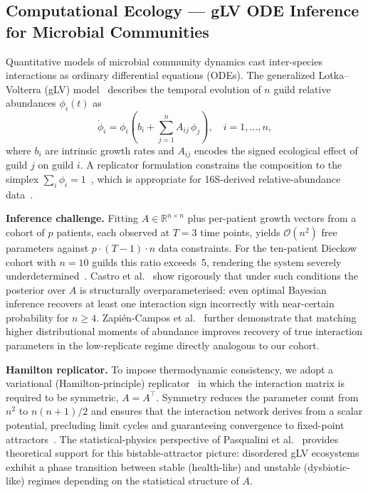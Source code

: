 \subsection{Computational Ecology --- gLV ODE Inference for Microbial Communities}
\label{sec:intro_ecol}

Quantitative models of microbial community dynamics cast inter-species interactions
as ordinary differential equations (ODEs).
The generalized Lotka--Volterra (gLV) model~\cite{Lotka1925Elements, Stein2013gLV}
describes the temporal evolution of $n$ guild relative abundances $\phi_i(t)$ as
\begin{equation}
  \dot{\phi}_i = \phi_i\!\left(b_i + \sum_{j=1}^{n} A_{ij}\,\phi_j\right),
  \quad i = 1,\ldots,n,
\end{equation}
where $b_i$ are intrinsic growth rates and $A_{ij}$ encodes the signed ecological
effect of guild $j$ on guild $i$.
A replicator formulation constrains the composition to the simplex
$\sum_i\phi_i = 1$~\cite{TaylorJonker1978Replicator, Hofbauer1998EGT}, which is
appropriate for 16S-derived relative-abundance data~\cite{Gloor2017Microbiome}.

\textbf{Inference challenge.}
Fitting $A \in \mathbb{R}^{n \times n}$ plus per-patient growth vectors from a cohort
of $p$ patients, each observed at $T = 3$ time points, yields $\mathcal{O}(n^2)$
free parameters against $p \cdot (T-1) \cdot n$ data constraints.
For the ten-patient Dieckow cohort with $n = 10$ guilds this ratio exceeds~5,
rendering the system severely underdetermined~\cite{Cao2017Identifiability, Castro2025scarce}.
Castro et al.~\cite{Castro2025scarce} show rigorously that under such conditions the
posterior over $A$ is structurally overparameterised: even optimal Bayesian inference
recovers at least one interaction sign incorrectly with near-certain probability for
$n \geq 4$.
Zapié{}n-Campos et al.~\cite{ZapienCampos2024Stochastic} further demonstrate that
matching higher distributional moments of abundance improves recovery of true
interaction parameters in the low-replicate regime directly analogous to our cohort.

\textbf{Hamilton replicator.}
To impose thermodynamic consistency, we adopt a variational (Hamilton-principle)
replicator~\cite{JunkerBalzani2021ExtendedHamilton, Klempt2024ContinuumGrowth} in which
the interaction matrix is required to be symmetric, $A = A^\top$.
Symmetry reduces the parameter count from $n^2$ to $n(n+1)/2$ and ensures that the
interaction network derives from a scalar potential, precluding limit cycles and
guaranteeing convergence to fixed-point attractors~\cite{Hofbauer1998EGT}.
The statistical-physics perspective of Pasqualini et al.~\cite{Pasqualini2024DisorGLV}
provides theoretical support for this bistable-attractor picture: disordered gLV
ecosystems exhibit a phase transition between stable (health-like) and unstable
(dysbiotic-like) regimes depending on the statistical structure of $A$.

